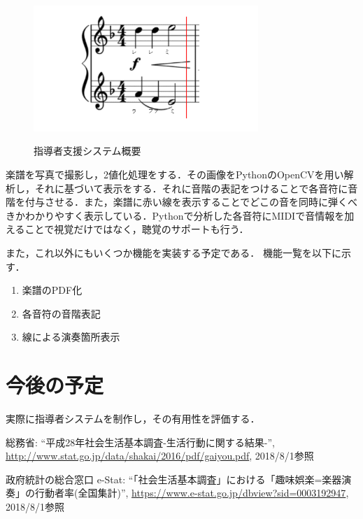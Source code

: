 \documentclass[twocolumn,10pt,a4j]{jsarticle}
\begin{document}
\begin{figure}[h]
\begin{center}
 \includegraphics[clip,width=85mm,height=55mm]{image.pdf}
\end{center}
 \caption{指導者支援システム概要}
 \label{fig:教科書}
\end{figure}

楽譜を写真で撮影し，2値化処理をする．その画像をPythonのOpenCVを用い解析し，それに基づいて表示をする．それに音階の表記をつけることで各音符に音階を付与させる．また，楽譜に赤い線を表示することでどこの音を同時に弾くべきかわかりやすく表示している．Pythonで分析した各音符にMIDIで音情報を加えることで視覚だけではなく，聴覚のサポートも行う．

また，これ以外にもいくつか機能を実装する予定である．
機能一覧を以下に示す．


\begin{enumerate}
\item 楽譜のPDF化
\item 各音符の音階表記
\item 線による演奏箇所表示
\end{enumerate}



\section{今後の予定}
実際に指導者システムを制作し，その有用性を評価する．

\begin{thebibliography}{99}
 総務省: ``平成28年社会生活基本調査-生活行動に関する結果-'', \url{http://www.stat.go.jp/data/shakai/2016/pdf/gaiyou.pdf}, 2018/8/1参照

 政府統計の総合窓口 e-Stat: ``「社会生活基本調査」における「趣味娯楽=楽器演奏」の行動者率(全国集計)'', \url{https://www.e-stat.go.jp/dbview?sid=0003192947}, 2018/8/1参照

\end{thebibliography}
\end{document}
